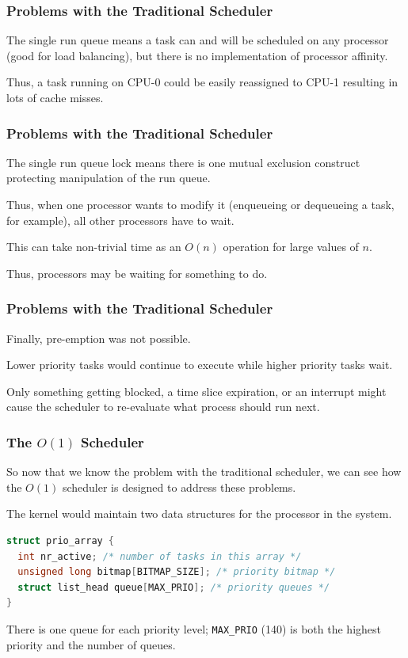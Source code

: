 \begin{frame}
\frametitle{Problems with the Traditional Scheduler}

The single run queue means a task can and will be scheduled on any processor (good for load balancing), but there is no implementation of processor affinity. 

Thus, a task running on CPU-0 could be easily reassigned to CPU-1 resulting in lots of cache misses.

\end{frame}

\begin{frame}
\frametitle{Problems with the Traditional Scheduler}

The single run queue lock means there is one mutual exclusion construct protecting manipulation of the run queue. 

Thus, when one processor wants to modify it (enqueueing or dequeueing a task, for example), all other processors have to wait.

This can take non-trivial time as an $O(n)$ operation for large values of $n$.


Thus, processors may be waiting for something to do.

\end{frame}

\begin{frame}
\frametitle{Problems with the Traditional Scheduler}

Finally, pre-emption was not possible. 

Lower priority tasks would continue to execute while higher priority tasks wait. 

Only something getting blocked, a time slice expiration, or an interrupt might cause the scheduler to re-evaluate what process should run next.


\end{frame}

\begin{frame}[fragile]
\frametitle{The $O(1)$ Scheduler}

So now that we know the problem with the traditional scheduler, we can see how the $O(1)$ scheduler is designed to address these problems. 

The kernel would maintain two data structures for the processor in the system.

\begin{lstlisting}[language=C]
struct prio_array {
  int nr_active; /* number of tasks in this array */
  unsigned long bitmap[BITMAP_SIZE]; /* priority bitmap */
  struct list_head queue[MAX_PRIO]; /* priority queues */
}
\end{lstlisting}

There is one queue for each priority level; \texttt{MAX\_PRIO} (140) is both the highest priority and the number of queues. 

\end{frame}


